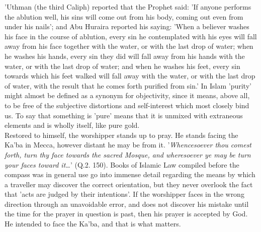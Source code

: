 \documentclass[10pt, twoside,openright]{book}
\begin{document}
'Uthman (the third Caliph) reported that the Prophet said: 'If anyone performs the ablution well, his 
sins will come out from his body, coming out even from under his nails'; and Abu Huraira reported his 
saying: 'When a believer washes his face in the course of ablution, every sin he contemplated with 
his eyes will fall away from his face together with the water, or with the last drop of water; when 
he washes his hands, every sin they did will fall away from his hands with the water, or with the 
last drop of water; and when he washes his feet, every sin towards which his feet walked will fall 
away with the water, or with the last drop of water, with the result that he comes forth purified 
from sin.' In Islam 'purity' might almost be defined as a synonym for objectivity, since it means, 
above all, to be free of the subjective distortions and self-interest which most closely bind us. To 
say that something is 'pure' means that it is unmixed with extraneous elements and is wholly itself, 
like pure gold. \\

Restored to himself, the worshipper stands up to pray. He stands facing the Ka'ba in Mecca, however 
distant he may be from it. '\emph{Whencesoever thou comest forth, turn thy face towards the sacred Mosque, 
and wheresoever ye may be turn your faces toward it\ldots{}}' (Q.2. 150). Books of Islamic Law compiled 
before the compass was in general use go into immense detail regarding the means by which a traveller 
may discover the correct orientation, but they never overlook the fact that 'acts are judged by their 
intentions'. If the worshipper faces in the wrong direction through an unavoidable error, and does 
not discover his mistake until the time for the prayer in question is past, then his prayer is 
accepted by God. He intended to face the Ka'ba, and that is what matters. \\
\end{document}

